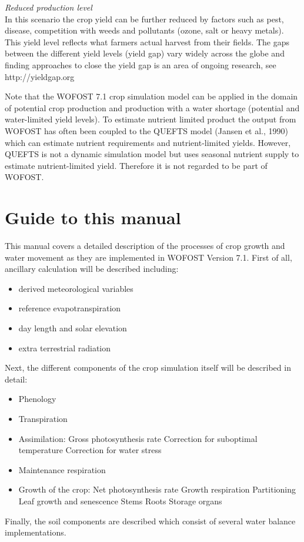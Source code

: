 {\it Reduced production level\/}\\
In this scenario the crop yield can be further reduced by factors such as pest, disease, competition with weeds
and pollutants (ozone, salt or heavy metals). This yield level reflects what farmers actual
harvest from their fields. The gaps between the different yield levels (yield gap) vary widely
across the globe and finding approaches to close the yield gap is an area of ongoing research,
see http://yieldgap.org

Note that the WOFOST 7.1 crop simulation model can be applied in the domain of potential crop
production and production with a water shortage (potential and water-limited yield levels). 
To estimate nutrient limited product the output from WOFOST has often been coupled to the QUEFTS
model (Jansen et al., 1990) which can estimate nutrient requirements and nutrient-limited yields.
However, QUEFTS is not a dynamic simulation model but uses seasonal nutrient supply to estimate
nutrient-limited yield. Therefore it is not regarded to be part of WOFOST.

\section{Guide to this manual}

This manual covers a detailed description of the processes of crop growth and water movement as they are
implemented in WOFOST Version 7.1. First of all, ancillary calculation will be described including:
\begin{itemize}
	\item derived meteorological variables
	\item reference evapotranspiration
	\item day length and solar elevation
	\item extra terrestrial radiation
\end{itemize}

Next, the different components of the crop simulation itself will be described in detail:
\begin{itemize}
	\item Phenology
	\item Transpiration
	\item Assimilation:
	\subitem Gross photosynthesis rate
	\subitem Correction for suboptimal temperature
	\subitem Correction for water stress
	\item Maintenance respiration
	\item Growth of the crop:
	\subitem Net photosynthesis rate
	\subitem Growth respiration
	\subitem Partitioning
	\subitem Leaf growth and senescence 
	\subitem Stems
	\subitem Roots
	\subitem Storage organs	
\end{itemize}

Finally, the soil components are described which consist of several water balance implementations.